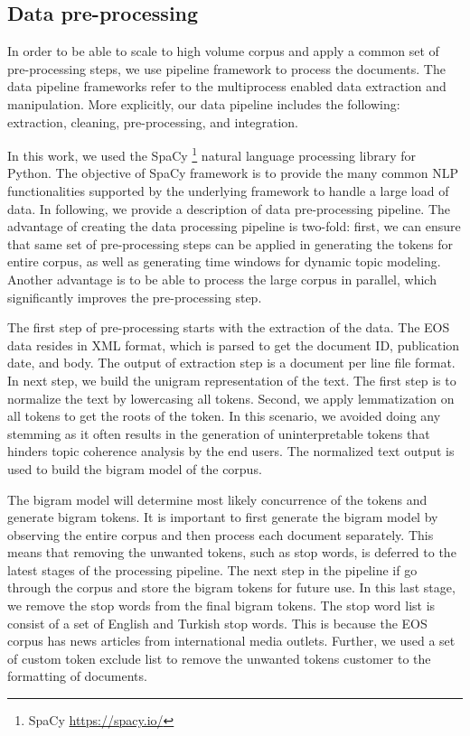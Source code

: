 \subsection{Data pre-processing}
In order to be able to scale to high volume corpus and apply a common set of pre-processing steps, we use pipeline framework to process the documents. The data pipeline frameworks refer to the multiprocess enabled data extraction and manipulation. More explicitly, our data pipeline includes the following: extraction, cleaning, pre-processing, and integration. 

In this work, we used the SpaCy \footnote{SpaCy \url{https://spacy.io/}} natural language processing library for Python. The objective of SpaCy framework is to provide the many common NLP functionalities supported by the underlying framework to handle a large load of data. In following, we provide a description of data pre-processing pipeline. The advantage of creating the data processing pipeline is two-fold: first, we can ensure that same set of pre-processing steps can be applied in generating the tokens for entire corpus, as well as generating time windows for dynamic topic modeling. Another advantage is to be able to process the large corpus in parallel, which significantly improves the pre-processing step.

The first step of pre-processing starts with the extraction of the data. The EOS data resides in XML format, which is parsed to get the document ID, publication date, and body. The output of extraction step is a document per line file format. In next step, we build the unigram representation of the text. The first step is to normalize the text by lowercasing all tokens. Second, we apply lemmatization on all tokens to get the roots of the token. In this scenario, we avoided doing any stemming as it often results in the generation of uninterpretable tokens that hinders topic coherence analysis by the end users. The normalized text output is used to build the bigram model of the corpus.

The bigram model will determine most likely concurrence of the tokens and generate bigram tokens. It is important to first generate the bigram model by observing the entire corpus and then process each document separately. This means that removing the unwanted tokens, such as stop words, is deferred to the latest stages of the processing pipeline. The next step in the pipeline if go through the corpus and store the bigram tokens for future use.  In this last stage, we remove the stop words from the final bigram tokens. The stop word list is consist of a set of English and Turkish stop words. This is because the EOS corpus has news articles from international media outlets. Further, we used a set of custom token exclude list to remove the unwanted tokens customer to the formatting of documents.

